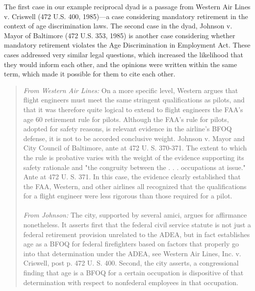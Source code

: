 \documentclass[headsepline=true, abstracton]{scrartcl}
\begin{document}
The first case in our example reciprocal dyad is a passage from Western Air Lines v. Criswell (472 U.S. 400, 1985)---a case considering mandatory retirement in the context of age discrimination laws. The second case in the dyad, Johnson v. Mayor of Baltimore (472 U.S. 353, 1985) is another case considering whether mandatory retirement violates the Age Discrimination in Employment Act. These cases addressed very similar legal questions, which increased the likelihood that they would inform each other, and the opinions were written within the same term, which made it possible for them to cite each other. 
\begin{quotation}
{\em From Western Air Lines:} On a more specific level, Western argues that flight engineers must meet the same stringent qualifications as pilots, and that it was therefore quite logical to extend to flight engineers the FAA's age 60 retirement rule for pilots. Although the FAA's rule for pilots, adopted for safety reasons, is relevant evidence in the airline's BFOQ defense, it is not to be accorded conclusive weight. Johnson v. Mayor and City Council of Baltimore, ante at 472 U. S. 370-371. The extent to which the rule is probative varies with the weight of the evidence supporting its safety rationale and "the congruity between the . . . occupations at issue." Ante at 472 U. S. 371. In this case, the evidence clearly established that the FAA, Western, and other airlines all recognized that the qualifications for a flight engineer were less rigorous than those required for a pilot.
\\~\\
{\em From Johnson:} The city, supported by several amici, argues for affirmance nonetheless. It asserts first that the federal civil service statute is not just a federal retirement provision unrelated to the ADEA, but in fact establishes age as a BFOQ for federal firefighters based on factors that properly go into that determination under the ADEA, see Western Air Lines, Inc. v. Criswell, post p. 472 U. S. 400. Second, the city asserts, a congressional finding that age is a BFOQ for a certain occupation is dispositive of that determination with respect to nonfederal employees in that occupation. 
\end{quotation} %
\end{document}
